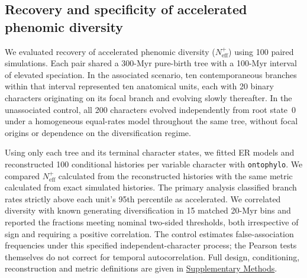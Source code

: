 \subsection*{Recovery and specificity of accelerated phenomic diversity}
\label{sec:paired-neff-main}
We evaluated recovery of accelerated phenomic diversity
($N_{\mathrm{eff}}^{+}$) using 100 paired simulations. Each pair shared a
300-Myr pure-birth tree with a 100-Myr interval of elevated speciation.
In the associated scenario, ten contemporaneous branches within that interval
represented ten anatomical units, each with 20 binary characters originating
on its focal branch and evolving slowly thereafter. In the unassociated
control, all 200 characters evolved independently from root state~0 under a
homogeneous equal-rates model throughout the same tree, without focal origins
or dependence on the diversification regime.

Using only each tree and its terminal character states, we fitted ER models
and reconstructed 100 conditional histories per variable character with
\texttt{ontophylo}. We compared $N_{\mathrm{eff}}^{+}$ calculated from the
reconstructed histories with the same metric calculated from exact simulated
histories. The primary analysis classified branch rates strictly above each
unit's 95th percentile as accelerated. We correlated diversity with known
generating diversification in 15 matched 20-Myr bins and reported the
fractions meeting nominal two-sided thresholds, both irrespective of sign
and requiring a positive correlation. The control estimates false-association
frequencies under this specified independent-character process; the Pearson
tests themselves do not correct for temporal autocorrelation. Full design,
conditioning, reconstruction and metric definitions are given in
\hyperref[sec:paired-neff-supplement]{Supplementary Methods}.

